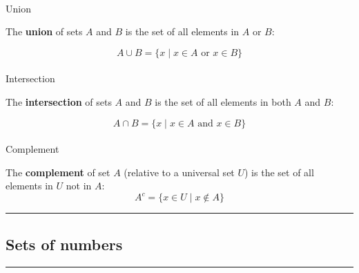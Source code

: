 \documentclass[
  letterpaper,
  DIV=11,
  numbers=noendperiod]{scrartcl}
\makeatletter
\let\oldparagraph\paragraph
\renewcommand{\paragraph}{
    \@ifstar
      \xxxParagraphStar
      \xxxParagraphNoStar
  }
\newcommand{\xxxParagraphStar}[1]{\oldparagraph*{#1}\mbox{}}
\newcommand{\xxxParagraphNoStar}[1]{\oldparagraph{#1}\mbox{}}
\makeatother
\begin{document}
\begin{tcolorbox}[enhanced jigsaw, opacityback=0, colbacktitle=quarto-callout-tip-color!10!white, toptitle=1mm, breakable, toprule=.15mm, colframe=quarto-callout-tip-color-frame, leftrule=.75mm, coltitle=black, rightrule=.15mm, colback=white, titlerule=0mm, title=\textcolor{quarto-callout-tip-color}{\faLightbulb}\hspace{0.5em}{Operations}, arc=.35mm, opacitybacktitle=0.6, left=2mm, bottomrule=.15mm, bottomtitle=1mm]

\paragraph{Union}\label{union}

The \textbf{union} of sets \(A\) and \(B\) is the set of all elements in
\(A\) or \(B\):

\[
A \cup B = \{ x \mid x \in A \text{ or } x \in B \}
\]

\paragraph{Intersection}\label{intersection}

The \textbf{intersection} of sets \(A\) and \(B\) is the set of all
elements in both \(A\) and \(B\):

\[
A \cap B = \{ x \mid x \in A \text{ and } x \in B \}
\]

\paragraph{Complement}\label{complement}

The \textbf{complement} of set \(A\) (relative to a universal set \(U\))
is the set of all elements in \(U\) not in \(A\):\\
\[
A^{c} = \{ x \in U \mid x \notin A \}
\]

\end{tcolorbox}

\begin{center}\rule{0.5\linewidth}{0.5pt}\end{center}

\subsection{Sets of numbers}\label{sets-of-numbers}

\begin{center}\rule{0.5\linewidth}{0.5pt}\end{center}
\end{document}
